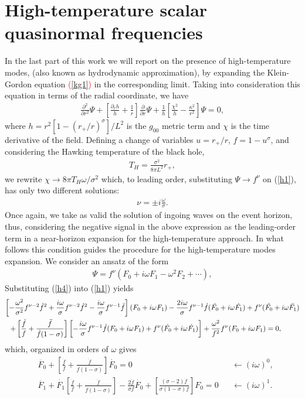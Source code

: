 \documentclass[preprint]{revtex4-1}
\def\be{\begin{eqnarray}}
\def\ee{\end{eqnarray}}
\newcommand*{\red}{\textcolor{red}}
\begin{document}
\section{High-temperature scalar quasinormal frequencies}\label{hidrodinamicos}

In the last part of this work we will report on the presence of high-temperature modes, (also known as hydrodynamic approximation), by expanding the Klein-Gordon equation \red{(\ref{kg1})} in  the corresponding limit. Taking into consideration this equation in terms of the radial coordinate, we have 
\be
\label{h1}
\frac{\partial^2}{\partial r^2}\Psi + \left[ \frac{\partial_r h}{h} + \frac{1}{r} \right] \frac{\partial }{\partial r} \Psi + \frac{1}{h}\left[ \frac{\chi^2}{h} - \frac{\kappa^2}{r^2} \right] \Psi = 0,
\ee
where $h=r^2[1-(r_+ / r)^\sigma]/L^2$ is the $g_{00}$ metric term and $\chi$ is the time derivative of the field. Defining a change of variables $u=r_+ / r$, $f=1-u^\sigma$, and considering the Hawking temperature of the black hole, 
\be
\label{h2}
T_H = \frac{\sigma^2}{8\pi L^2} r_+,
\ee
we rewrite $\chi \rightarrow 8\pi T_H \omega / \sigma^2$ which, to leading order, substituting $\Psi \rightarrow f^\nu$ on (\ref{h1}), has only two different solutions:
\be
\label{h3}
\nu = \pm i \frac{\omega}{\sigma}.
\ee
Once again, we take as valid the solution of ingoing waves on the event horizon, thus, considering the negative signal in the above expression as the leading-order term in a near-horizon expansion for the high-temperature approach. In what follows this condition guides the procedure for the high-temperature modes expansion. We consider an ansatz of the form
\be
\label{h4}
\Psi = f^\nu (F_0 + i\omega F_1 - \omega^2 F_2 + \cdots ),
\ee
Substituting (\ref{h4}) into (\ref{h1}) yields
\be
\nonumber
\left[ - \frac{\omega^2}{\sigma^2}f^{\nu - 2}\dot{f}^2 + \frac{i \omega }{\sigma} f^{\nu - 2}\dot{f}^2 -\frac{i\omega}{\sigma}f^{\nu-1}\ddot{f} \right](F_0 + i\omega F_1) -\frac{2i\omega}{\sigma} f^{\nu -1 }\dot{f}(\dot{F_0} + i\omega \dot{F_1}) + f^\nu (\ddot{F_0} + i\omega \ddot{F_1})\\
+\left[ \frac{\dot{f}}{f} + \frac{\ddot{f}}{\dot{f}(1-\sigma )}\right] \left[ -\frac{i \omega }{\sigma }f^{\nu - 1} \dot{f} (F_0 + i\omega F_1 ) + f^\nu ( \dot{F_0} + i\omega \dot{F_1})\right] + \frac{\omega^2}{f^2}f^\nu ( F_0+i\omega F_1 ) =0, \hspace{0.9cm}
\label{h5}
\ee
which, organized in orders of $\omega$ gives
\begin{align}
\label{h6}
&\ddot{F_0} + \left[\frac{\dot{f}}{f} + \frac{\ddot{f}}{\dot{f}(1-\sigma )} \right] \dot{F_0}=0 &&\leftarrow (i\omega)^0, \\
\label{h7}
&\ddot{F_1} + \dot{F_1} \left[ \frac{\dot{f}}{f} + \frac{\ddot{f}}{\dot{f}(1-\sigma )}\right] - \frac{2\dot{f}}{\sigma f}\dot{F_0} + \left[ \frac{(\sigma -2)\dot{f}}{\sigma (1-\sigma ) f}\right] F_0=0 &&\leftarrow  (i\omega)^1.
\end{align}
\end{document}

